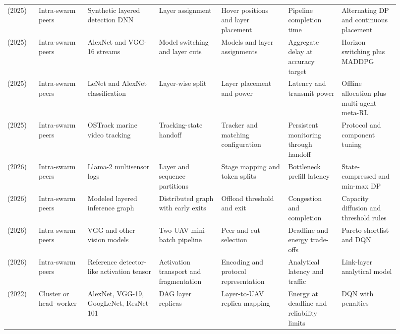 \begin{longtable}{@{}Y{0.075\linewidth}Y{0.111\linewidth}Y{0.169\linewidth}Y{0.145\linewidth}Y{0.151\linewidth}Y{0.125\linewidth}Y{0.139\linewidth}@{}}
\cite{R0006}\newline\mbox{(2025)} & Intra-swarm peers & Synthetic layered detection DNN & Layer assignment & Hover positions and layer placement & Pipeline completion time & Alternating DP and continuous placement \\
\cite{R0059}\newline\mbox{(2025)} & Intra-swarm peers & AlexNet and VGG-16 streams & Model switching and layer cuts & Models and layer assignments & Aggregate delay at accuracy target & Horizon switching plus MADDPG \\
\cite{R0068}\newline\mbox{(2025)} & Intra-swarm peers & LeNet and AlexNet classification & Layer-wise split & Layer placement and power & Latency and transmit power & Offline allocation plus multi-agent meta-RL \\
\cite{R0292}\newline\mbox{(2025)} & Intra-swarm peers & OSTrack marine video tracking & Tracking-state handoff & Tracker and matching configuration & Persistent monitoring through handoff & Protocol and component tuning \\
\cite{R0074}\newline\mbox{(2026)} & Intra-swarm peers & Llama-2 multisensor logs & Layer and sequence partitions & Stage mapping and token splits & Bottleneck prefill latency & State-compressed and min-max DP \\
\cite{R0077}\newline\mbox{(2026)} & Intra-swarm peers & Modeled layered inference graph & Distributed graph with early exits & Offload threshold and exit & Congestion and completion & Capacity diffusion and threshold rules \\
\cite{R0092}\newline\mbox{(2026)} & Intra-swarm peers & VGG and other vision models & Two-UAV mini-batch pipeline & Peer and cut selection & Deadline and energy trade-offs & Pareto shortlist and DQN \\
\cite{R0121}\newline\mbox{(2026)} & Intra-swarm peers & Reference detector-like activation tensor & Activation transport and fragmentation & Encoding and protocol representation & Analytical latency and traffic & Link-layer analytical model \\
\cite{R0029}\newline\mbox{(2022)} & Cluster or head--worker & AlexNet, VGG-19, GoogLeNet, ResNet-101 & DAG layer replicas & Layer-to-UAV replica mapping & Energy at deadline and reliability limits & DQN with penalties \\

\end{longtable}
